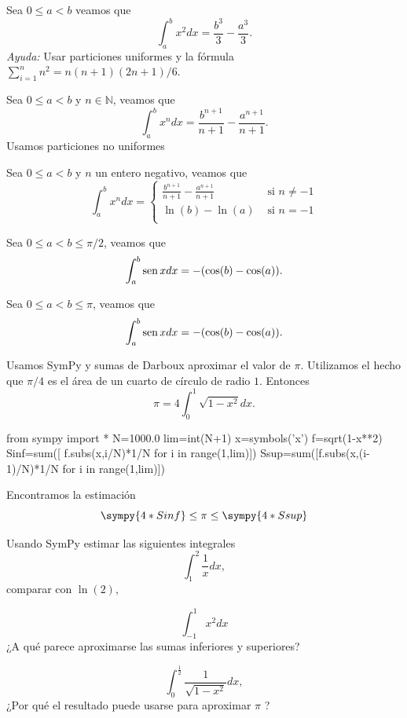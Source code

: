 \begin{ejercicio} Sea $0\leq a<b$ veamos que 
\[
 \int_a^b x^2 dx=\frac{b^3}{3}-\frac{a^3}{3}.
\]
{\em Ayuda:} Usar particiones uniformes y la fórmula $\sum_{i=1}^nn^2= n(n+1)(2n+1)/6$.
\end{ejercicio}

\begin{ejemplo} Sea $0\leq a<b$ y $n\in\mathbb{N}$,  veamos que 
\[
 \int_a^b x^n dx=\frac{b^{n+1}}{n+1}-\frac{a^{n+1}}{n+1}.
\]
Usamos particiones no uniformes
\end{ejemplo}

\begin{ejercicio} Sea $0\leq a<b$ y $n$ un entero negativo, veamos que
\[
 \int_a^b x^n dx=\begin{cases}
                  \frac{b^{n+1}}{n+1}-\frac{a^{n+1}}{n+1} & \text{ si } n\neq -1\\
                  \ln(b)-\ln(a) & \text{ si } n=-1\\
                 \end{cases}
\]
\end{ejercicio}


\begin{ejemplo} Sea $0\leq a<b\leq \pi/2$, veamos que
\[
 \int_a^b \operatorname{sen} x dx=-(\cos(b)-\cos(a)).
\]
\end{ejemplo}



\begin{ejercicio} Sea $0\leq a<b\leq \pi$, veamos que
\[
 \int_a^b \operatorname{sen} x dx=-(\cos(b)-\cos(a)).
\]
\end{ejercicio}


\begin{ejemplo} Usamos SymPy y sumas de Darboux aproximar el valor de $\pi$. Utilizamos el hecho que $\pi/4$ es el área de un cuarto de círculo de radio $1$. Entonces 
$$\pi=4\int_0^1\sqrt{1-x^2}dx.$$

\begin{sympyblock}
from sympy import *
N=1000.0
lim=int(N+1)
x=symbols('x')
f=sqrt(1-x**2)
Sinf=sum([ f.subs(x,i/N)*1/N for i in range(1,lim)])
Ssup=sum([f.subs(x,(i-1)/N)*1/N for i in range(1,lim)])
\end{sympyblock}
Encontramos la estimación
\[\sympy{4*Sinf}\leq \pi \leq \sympy{4*Ssup}\]
\end{ejemplo}

\begin{ejercicio} Usando SymPy estimar las siguientes integrales 
$$\int_1^2\frac{1}{x}dx,$$
 comparar con $\ln(2)$,

$$\int_{-1}^{1}x^2dx$$
¿A qué parece aproximarse las sumas inferiores y superiores?

$$\int_0^{\frac{1}{2}}\frac{1}{\sqrt{1-x^2}}dx,$$
¿Por qué el resultado puede usarse para aproximar $\pi$ ?

 
\end{ejercicio}




